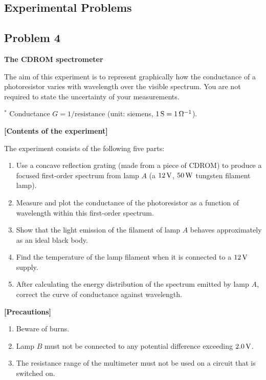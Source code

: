 \subsection*{Experimental Problems}

\subsection*{Problem 4}

\textbf{The CDROM spectrometer}

The aim of this experiment is to represent graphically how the conductance of a photoresistor varies with wavelength over the visible spectrum. You are not required to state the uncertainty of your measurements.

$^*$ Conductance $G=1/\text{resistance}$ (unit: siemens, $1\,\mathrm{S}=1\,\mathrm{\Omega^{-1}}$).

\textbf{[Contents of the experiment]}

The experiment consists of the following five parts:

\begin{enumerate}
\item[(1)] Use a concave reflection grating (made from a piece of CDROM) to produce a focused first-order spectrum from lamp $A$ (a $12\,\mathrm{V}$, $50\,\mathrm{W}$ tungsten filament lamp).
\item[(2)] Measure and plot the conductance of the photoresistor as a function of wavelength within this first-order spectrum.
\item[(3)] Show that the light emission of the filament of lamp $A$ behaves approximately as an ideal black body.
\item[(4)] Find the temperature of the lamp filament when it is connected to a $12\,\mathrm{V}$ supply.
\item[(5)] After calculating the energy distribution of the spectrum emitted by lamp $A$, correct the curve of conductance against wavelength.
\end{enumerate}

\textbf{[Precautions]}

\begin{enumerate}
\item[(1)] Beware of burns.
\item[(2)] Lamp $B$ must not be connected to any potential difference exceeding $2.0\,\mathrm{V}$.
\item[(3)] The resistance range of the multimeter must not be used on a circuit that is switched on.
\end{enumerate}

